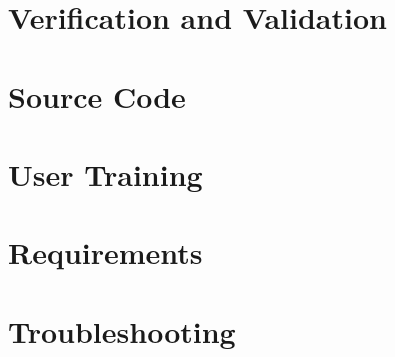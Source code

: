 \documentclass{simcenterdocumentation}
\begin{document}
\chapter{Verification and Validation}
\label{chap:vnv}


\chapter{Source Code}
\label{chap:SourceCode}


\chapter{User Training}
\label{chap:training}


\chapter{Requirements}
\label{chap:requirements}


\chapter{Troubleshooting}
\label{chap:troubleshooting}


\nocite{*}


\pagestyle{plain}
{
  \renewcommand{\thispagestyle}[1]{}	
  \printbibliography           
}
\end{document}
